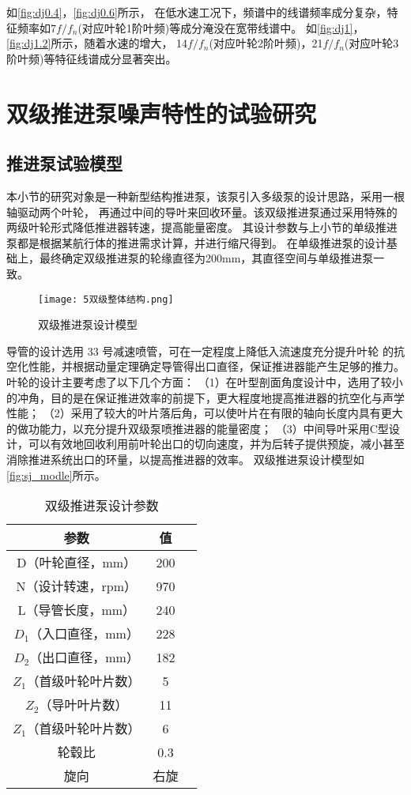 如\autoref{fig:dj0.4}，\autoref{fig:dj0.6}所示，
在低水速工况下，频谱中的线谱频率成分复杂，特征频率如7$f/f_n$(对应叶轮1阶叶频)等成分淹没在宽带线谱中。
如\autoref{fig:dj1}，\autoref{fig:dj1.2}所示，随着水速的增大，
14$f/f_n$(对应叶轮2阶叶频)，21$f/f_n$(对应叶轮3阶叶频)等特征线谱成分显著突出。
\section{双级推进泵噪声特性的试验研究}
\subsection{推进泵试验模型}
本小节的研究对象是一种新型结构推进泵，该泵引入多级泵的设计思路，采用一根轴驱动两个叶轮，
再通过中间的导叶来回收环量。该双级推进泵通过采用特殊的两级叶轮形式降低推进器转速，提高能量密度。
其设计参数与上小节的单级推进泵都是根据某航行体的推进需求计算，并进行缩尺得到。
在单级推进泵的设计基础上，最终确定双级推进泵的轮缘直径为200mm，其直径空间与单级推进泵一致。
\begin{figure}[htbp]
    \centering
    \texttt{[image: 5双级整体结构.png]}
    \caption{\label{fig:sj_modle}双级推进泵设计模型}
\end{figure}

导管的设计选用 33 号减速喷管，可在一定程度上降低入流速度充分提升叶轮
的抗空化性能，并根据动量定理确定导管得出口直径，保证推进器能产生足够的推力。
叶轮的设计主要考虑了以下几个方面：
（1）在叶型剖面角度设计中，选用了较小的冲角，目的是在保证推进效率的前提下，更大程度地提高推进器的抗空化与声学性能；
（2）采用了较大的叶片落后角，可以使叶片在有限的轴向长度内具有更大的做功能力，以充分提升双级泵喷推进器的能量密度；
（3）中间导叶采用C型设计，可以有效地回收利用前叶轮出口的切向速度，并为后转子提供预旋，减小甚至消除推进系统出口的环量，以提高推进器的效率。
双级推进泵设计模型如\autoref{fig:sj_modle}所示。
\begin{table}[htbp]
    \centering
    \caption{\label{tab:sj}双级推进泵设计参数}
    \begin{tabular}{ccc}
     \toprule
     参数&值\\
     \midrule
     D（叶轮直径，mm）&200\\
     N（设计转速，rpm）&970\\
     L（导管长度，mm）&240\\
     $D_1$（入口直径，mm）&228\\
     $D_2$（出口直径，mm）&182\\
     $Z_1$（首级叶轮叶片数）&5\\
     $Z_2$（导叶叶片数）&11\\
     $Z_1$（首级叶轮叶片数）&6\\
     轮毂比&0.3\\
     旋向&右旋\\
     \bottomrule
    \end{tabular}
\end{table}

